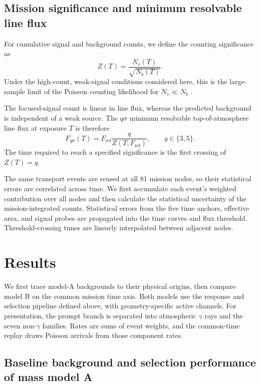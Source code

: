 \documentclass[11pt]{article}
\newcommand{\fref}{F_{\mathrm{ref}}}
\begin{document}
\subsection{Mission significance and minimum resolvable line flux}
\label{sec:mission_sensitivity}

For cumulative signal and background counts, we define the counting
significance as
\begin{equation}
 Z(T)=\frac{N_s(T)}{\sqrt{N_b(T)}}.
 \label{eq:mission_significance}
\end{equation}
Under the high-count, weak-signal conditions considered here, this is the
large-sample limit of the Poisson counting likelihood for $N_s\ll N_b$
\cite{Cowan2011}.

The focused-signal count is linear in line flux, whereas the predicted
background is independent of a weak source. The $q\sigma$ minimum resolvable
top-of-atmosphere line flux at exposure $T$ is therefore
\begin{equation}
 F_{q\sigma}(T)=\fref\frac{q}{Z(T;\fref)},
 \qquad q\in\{3,5\}.
 \label{eq:minimum_flux}
\end{equation}
The time required to reach a specified significance is the first crossing of
$Z(T)=q$.

The same transport events are reused at all 81 mission nodes, so their
statistical errors are correlated across time. We first accumulate each event's
weighted contribution over all nodes and then calculate the statistical
uncertainty of the mission-integrated counts. Statistical errors from the five
time anchors, effective area, and signal probes are propagated into the time
curves and flux threshold. Threshold-crossing times are linearly interpolated
between adjacent nodes.

\section{Results}
\label{sec:results}

We first trace model-A backgrounds to their physical origins, then compare model
B on the common mission time axis. Both models use the response and selection
pipeline defined above, with geometry-specific active channels. For
presentation, the prompt branch is separated into atmospheric $\gamma$ rays and
the seven non-$\gamma$ families. Rates are sums of event weights, and the
common-time replay draws Poisson arrivals from those component rates.

\subsection{Baseline background and selection performance of mass model A}
\label{subsec:model_a_baseline}
\end{document}
